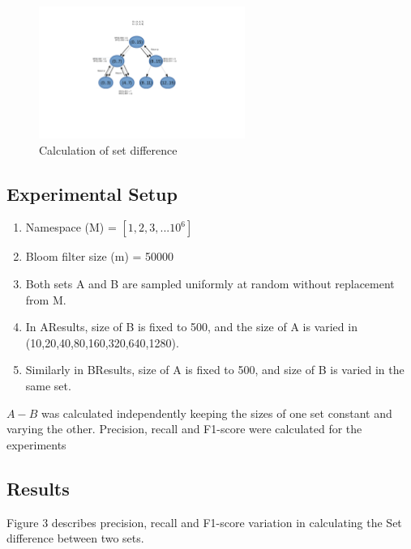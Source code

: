 \documentclass[a4paper]{article}
\begin{document}
\begin{figure}[h!] 
\centering
\includegraphics[width=0.6\textwidth]{sd.png}
\caption{\label{fig:Set Difference}Calculation of set difference}
\end{figure}



\subsection{Experimental Setup}
\begin{enumerate}
 \item Namespace (M) = $[1, 2, 3, ... 10^6]$
 \item Bloom filter size (m) = 50000
 \item Both sets A and B are sampled uniformly at random without replacement from M.
 \item In AResults, size of B is fixed to 500, and the size of A is varied in (10,20,40,80,160,320,640,1280).
 \item Similarly in BResults, size of A is fixed to 500, and size of B is varied in the same set.

\end{enumerate}

$A-B$ was calculated independently keeping the sizes of one set constant and varying the other. Precision, recall and F1-score were calculated for the experiments

\subsection{Results}
Figure 3 describes precision, recall and F1-score variation in calculating the Set difference between two sets.
\end{document}
